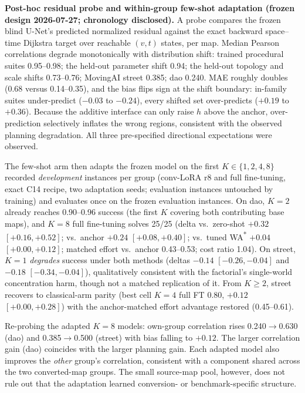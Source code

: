 \documentclass[letterpaper]{article} %
\begin{document}
\textbf{Post-hoc residual probe and within-group few-shot adaptation (frozen design 2026-07-27; chronology disclosed).} A probe compares the frozen blind U-Net's predicted normalized residual against the exact backward space--time Dijkstra target over reachable $(v,t)$ states, per map. Median Pearson correlations degrade monotonically with distribution shift: trained procedural suites 0.95--0.98; the held-out parameter shift 0.94; the held-out topology and scale shifts 0.73--0.76; MovingAI street 0.385; dao 0.240. MAE roughly doubles (0.68 versus 0.14--0.35), and the bias flips sign at the shift boundary: in-family suites under-predict ($-0.03$ to $-0.24$), every shifted set over-predicts ($+0.19$ to $+0.36$). Because the additive interface can only raise $h$ above the anchor, over-prediction selectively inflates the wrong regions, consistent with the observed planning degradation. All three pre-specified directional expectations were observed.

The few-shot arm then adapts the frozen model on the first $K \in \{1,2,4,8\}$ recorded \emph{development} instances per group (conv-LoRA r8 and full fine-tuning, exact C14 recipe, two adaptation seeds; evaluation instances untouched by training) and evaluates once on the frozen evaluation instances. On dao, $K{=}2$ already reaches 0.90--0.96 success (the first $K$ covering both contributing base maps), and $K{=}8$ full fine-tuning solves 25/25 (delta vs.\ zero-shot $+0.32$ $[+0.16,+0.52]$; vs.\ anchor $+0.24$ $[+0.08,+0.40]$; vs.\ tuned WA\textsuperscript{*} $+0.04$ $[+0.00,+0.12]$; matched effort vs.\ anchor 0.43--0.53; cost ratio 1.04). On street, $K{=}1$ \emph{degrades} success under both methods (deltas $-0.14$ $[-0.26,-0.04]$ and $-0.18$ $[-0.34,-0.04]$), qualitatively consistent with the factorial's single-world concentration harm, though not a matched replication of it. From $K \geq 2$, street recovers to classical-arm parity (best cell $K{=}4$ full FT 0.80, $+0.12$ $[+0.00,+0.28]$) with the anchor-matched effort advantage restored (0.45--0.61).

Re-probing the adapted $K{=}8$ models: own-group correlation rises 0.240$\to$0.630 (dao) and 0.385$\to$0.500 (street) with bias falling to $+0.12$. The larger correlation gain (dao) coincides with the larger planning gain. Each adapted model also improves the \emph{other} group's correlation, consistent with a component shared across the two converted-map groups. The small source-map pool, however, does not rule out that the adaptation learned conversion- or benchmark-specific structure.
\end{document}
